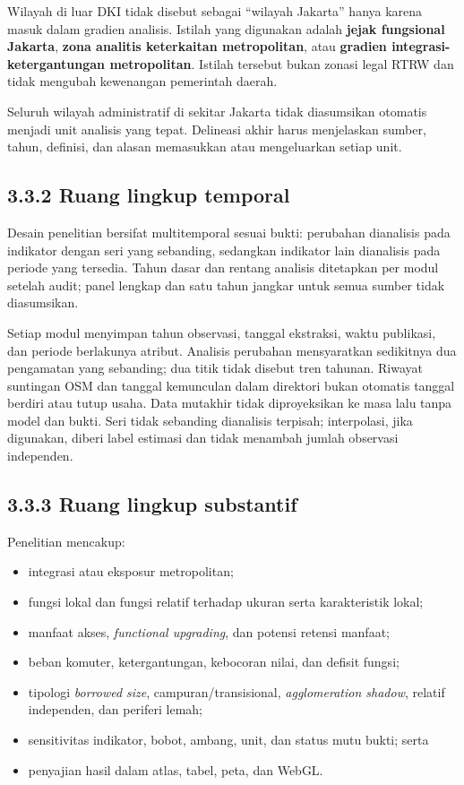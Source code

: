 \documentclass[
  indonesian,
  11pt,
  a4paper,
  oneside,
  openany]{report}
\providecommand{\tightlist}{%
  \setlength{\itemsep}{0pt}\setlength{\parskip}{0pt}}
\begin{document}
Wilayah di luar DKI tidak disebut sebagai ``wilayah Jakarta'' hanya
karena masuk dalam gradien analisis. Istilah yang digunakan adalah
\textbf{jejak fungsional Jakarta}, \textbf{zona analitis keterkaitan
metropolitan}, atau \textbf{gradien integrasi-ketergantungan
metropolitan}. Istilah tersebut bukan zonasi legal RTRW dan tidak
mengubah kewenangan pemerintah daerah.

Seluruh wilayah administratif di sekitar Jakarta tidak diasumsikan
otomatis menjadi unit analisis yang tepat. Delineasi akhir harus
menjelaskan sumber, tahun, definisi, dan alasan memasukkan atau
mengeluarkan setiap unit.

\subsection{3.3.2 Ruang lingkup temporal}\label{ruang-lingkup-temporal}

Desain penelitian bersifat multitemporal sesuai bukti: perubahan
dianalisis pada indikator dengan seri yang sebanding, sedangkan
indikator lain dianalisis pada periode yang tersedia. Tahun dasar dan
rentang analisis ditetapkan per modul setelah audit; panel lengkap dan
satu tahun jangkar untuk semua sumber tidak diasumsikan.

Setiap modul menyimpan tahun observasi, tanggal ekstraksi, waktu
publikasi, dan periode berlakunya atribut. Analisis perubahan
mensyaratkan sedikitnya dua pengamatan yang sebanding; dua titik tidak
disebut tren tahunan. Riwayat suntingan OSM dan tanggal kemunculan dalam
direktori bukan otomatis tanggal berdiri atau tutup usaha. Data mutakhir
tidak diproyeksikan ke masa lalu tanpa model dan bukti. Seri tidak
sebanding dianalisis terpisah; interpolasi, jika digunakan, diberi label
estimasi dan tidak menambah jumlah observasi independen.

\subsection{3.3.3 Ruang lingkup
substantif}\label{ruang-lingkup-substantif}

Penelitian mencakup:

\begin{itemize}
\tightlist
\item
  integrasi atau eksposur metropolitan;
\item
  fungsi lokal dan fungsi relatif terhadap ukuran serta karakteristik
  lokal;
\item
  manfaat akses, \emph{functional upgrading}, dan potensi retensi
  manfaat;
\item
  beban komuter, ketergantungan, kebocoran nilai, dan defisit fungsi;
\item
  tipologi \emph{borrowed size}, campuran/transisional,
  \emph{agglomeration shadow}, relatif independen, dan periferi lemah;
\item
  sensitivitas indikator, bobot, ambang, unit, dan status mutu bukti;
  serta
\item
  penyajian hasil dalam atlas, tabel, peta, dan WebGL.
\end{itemize}
\end{document}

